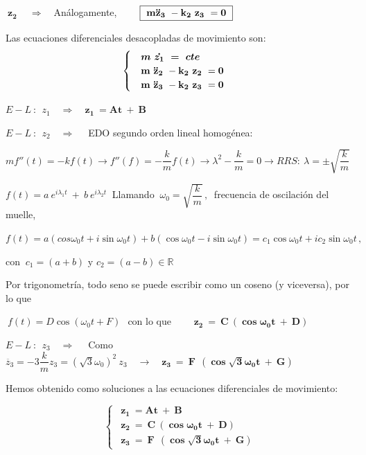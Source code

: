 $\boxed{ \ \boldsymbol{z_2} \ } \quad \Rightarrow \ \ \ $
Análogamente, $\qquad  \boxed{ \bold{\ m\ddot{z}_3 \ -k_2\ z_3\ = 0\ }}$


\vspace{0.5cm}
Las ecuaciones diferenciales desacopladas de movimiento son:
\begin{equation}
\begin{cases}
\ \ \ \boldsymbol{ m\ \dot{z_1}\ = \ cte }
\\
\ \ \bold{\ m\ \ddot{z}_2 \ -k_2\ z_2\ = 0\ }
\\
\ \ \bold{\ m\ \ddot{z}_3 \ -k_2\ z_3\ = 0\ }	
\end{cases}
\end{equation}

$E-L \ : \ \  z_1 \quad \Rightarrow \quad \boldsymbol{  z_1 \ = A t \ + \ B }$

$E-L \ : \ \ z_2 \quad \Rightarrow \quad $ EDO segundo orden lineal homogénea:

\begin{adjustwidth}{10mm}{5mm}
$m f''(t)=-kf(t) \to f''(f)=-\dfrac k m f(t) \to \lambda^2-\dfrac k m =0 \to RRS:\ \lambda=\pm \sqrt{\dfrac k m}$

$f(t)=a\ e^{i\lambda_1 t}\ + \ b \ e^{i\lambda_2 t}\ $
Llamando $\ \omega_0=\sqrt{\dfrac k m }\, ,\  $ frecuencia de oscilación del muelle,

$f(t)=a(cos \omega_0 t+i\sin \omega_0 t)+b(\cos \omega_0 t-i\sin \omega_0 t)= c_1 \cos \omega_0 t + i c_2 \sin \omega_0 t\, , \ $ 

con $ \ c_1=(a+b) \text{ y } c_2=(a-b) \in \mathbb R $

Por trigonometría, todo seno se puede escribir como un coseno (y viceversa), por lo que 

$\ f(t)=D \cos (\omega_0 t + F)\, \ $ con lo que $ \qquad \boldsymbol{z_2 \ = \ C\ (\cos \omega_0 t \ + \  D)}$
\end{adjustwidth}




$E-L \ : \ \ z_3 \quad \Rightarrow \quad $ Como $\ddot {z_3}=-3\dfrac k m z_3=(\sqrt{3} \omega_0)^2 \ z_3 \quad \to \quad \boldsymbol{z_3 \ = \ F\ \ (\cos \sqrt{3} \omega_0 t \ + \ G)}$

\vspace{5mm}
Hemos obtenido como soluciones a las ecuaciones diferenciales de movimiento:

\begin{equation}
\begin{cases}
\ \ \boldsymbol{  z_1 \ = A t \ + \ B } \\ 
\ \ \boldsymbol{z_2 \ = \ C\ (\cos \omega_0 t \ + \  D)} \\
\ \ \boldsymbol{z_3 \ = \ F\ \ (\cos \sqrt{3} \omega_0 t \ + \ G)}	
\end{cases}
\end{equation}


